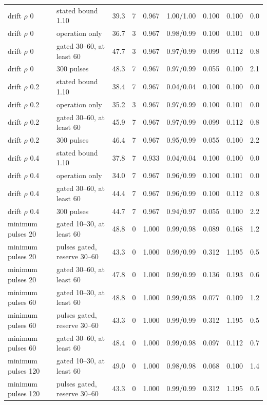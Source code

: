 \begin{table}[htbp]
\begin{tabular*}{\textwidth}{@{\extracolsep{\fill}}llccccccc@{}}
drift $\rho$ 0 & stated bound 1.10 & 39.3 & 7 & 0.967 & 1.00/1.00 & 0.100 & 0.100 & 0.0 \\
drift $\rho$ 0 & operation only & 36.7 & 3 & 0.967 & 0.98/0.99 & 0.100 & 0.101 & 0.0 \\
drift $\rho$ 0 & gated 30--60, at least 60 & 47.7 & 3 & 0.967 & 0.97/0.99 & 0.099 & 0.112 & 0.8 \\
drift $\rho$ 0 & 300 pulses & 48.3 & 7 & 0.967 & 0.97/0.99 & 0.055 & 0.100 & 2.1 \\
drift $\rho$ 0.2 & stated bound 1.10 & 38.4 & 7 & 0.967 & 0.04/0.04 & 0.100 & 0.100 & 0.0 \\
drift $\rho$ 0.2 & operation only & 35.2 & 3 & 0.967 & 0.97/0.99 & 0.100 & 0.101 & 0.0 \\
drift $\rho$ 0.2 & gated 30--60, at least 60 & 45.9 & 7 & 0.967 & 0.97/0.99 & 0.099 & 0.112 & 0.8 \\
drift $\rho$ 0.2 & 300 pulses & 46.4 & 7 & 0.967 & 0.95/0.99 & 0.055 & 0.100 & 2.2 \\
drift $\rho$ 0.4 & stated bound 1.10 & 37.8 & 7 & 0.933 & 0.04/0.04 & 0.100 & 0.100 & 0.0 \\
drift $\rho$ 0.4 & operation only & 34.0 & 7 & 0.967 & 0.96/0.99 & 0.100 & 0.101 & 0.0 \\
drift $\rho$ 0.4 & gated 30--60, at least 60 & 44.4 & 7 & 0.967 & 0.96/0.99 & 0.100 & 0.112 & 0.8 \\
drift $\rho$ 0.4 & 300 pulses & 44.7 & 7 & 0.967 & 0.94/0.97 & 0.055 & 0.100 & 2.2 \\
minimum pulses 20 & gated 10--30, at least 60 & 48.8 & 0 & 1.000 & 0.99/0.98 & 0.089 & 0.168 & 1.2 \\
minimum pulses 20 & pulses gated, reserve 30--60 & 43.3 & 0 & 1.000 & 0.99/0.99 & 0.312 & 1.195 & 0.5 \\
minimum pulses 20 & gated 30--60, at least 60 & 47.8 & 0 & 1.000 & 0.99/0.99 & 0.136 & 0.193 & 0.6 \\
minimum pulses 60 & gated 10--30, at least 60 & 48.8 & 0 & 1.000 & 0.99/0.98 & 0.077 & 0.109 & 1.2 \\
minimum pulses 60 & pulses gated, reserve 30--60 & 43.3 & 0 & 1.000 & 0.99/0.99 & 0.312 & 1.195 & 0.5 \\
minimum pulses 60 & gated 30--60, at least 60 & 48.4 & 0 & 1.000 & 0.99/0.98 & 0.097 & 0.112 & 0.7 \\
minimum pulses 120 & gated 10--30, at least 60 & 49.0 & 0 & 1.000 & 0.98/0.98 & 0.068 & 0.100 & 1.4 \\
minimum pulses 120 & pulses gated, reserve 30--60 & 43.3 & 0 & 1.000 & 0.99/0.99 & 0.312 & 1.195 & 0.5 \\

\end{tabular*}
\end{table}
